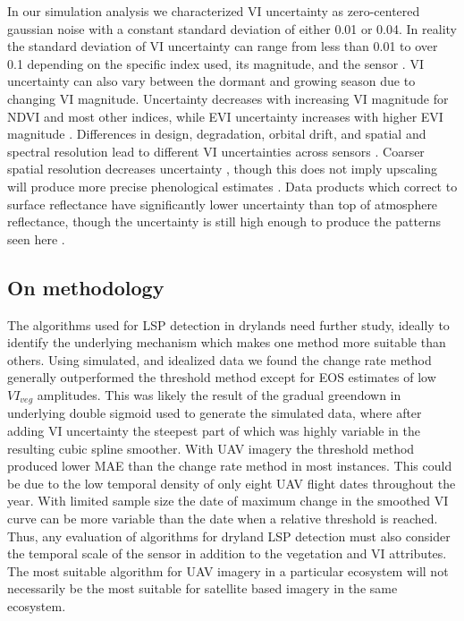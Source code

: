 \documentclass{article}
\begin{document}
In our simulation analysis we characterized VI uncertainty as zero-centered gaussian noise with a constant standard deviation of either 0.01 or 0.04. In reality the standard deviation of VI uncertainty can range from less than 0.01 to over 0.1 depending on the specific index used, its magnitude, and the sensor \cite{miura2000, nagol2009, borgogno-mondino2016}. VI uncertainty can also vary between the dormant and growing season due to changing VI magnitude. Uncertainty decreases with increasing VI magnitude for NDVI and most other indices, while EVI uncertainty increases with higher EVI magnitude \cite{miura2000}. Differences in design, degradation, orbital drift, and spatial and spectral resolution lead to different VI uncertainties across sensors \cite{miura2000, fan2017}. Coarser spatial resolution decreases uncertainty \cite{chen-zorn2013}, though this does not imply upscaling will produce more precise phenological estimates \cite{zhang-wang2017, peng-zhang2017, zeng-wardlow2020}. Data products which correct to surface reflectance have significantly lower uncertainty than top of atmosphere reflectance, though the uncertainty is still high enough to produce the patterns seen here \cite{nagol2009}. 

\subsection{On methodology}

The algorithms used for LSP detection in drylands need further study, ideally to identify the underlying mechanism which makes one method more suitable than others. Using simulated, and idealized data we found the change rate method generally outperformed the threshold method except for EOS estimates of low $VI_{veg}$ amplitudes. This was likely the result of the gradual greendown in underlying double sigmoid used to generate the simulated data, where after adding VI uncertainty the steepest part of which was highly variable in the resulting cubic spline smoother. With UAV imagery the threshold method produced lower MAE than the change rate method in most instances. This could be due to the low temporal density of only eight UAV flight dates throughout the year. With limited sample size the date of maximum change in the smoothed VI curve can be more variable than the date when a relative threshold is reached. Thus, any evaluation of algorithms for dryland LSP detection must also consider the temporal scale of the sensor in addition to the vegetation and VI attributes. The most suitable algorithm for UAV imagery in a particular ecosystem will not necessarily be the most suitable for satellite based imagery in the same ecosystem.
\end{document}
